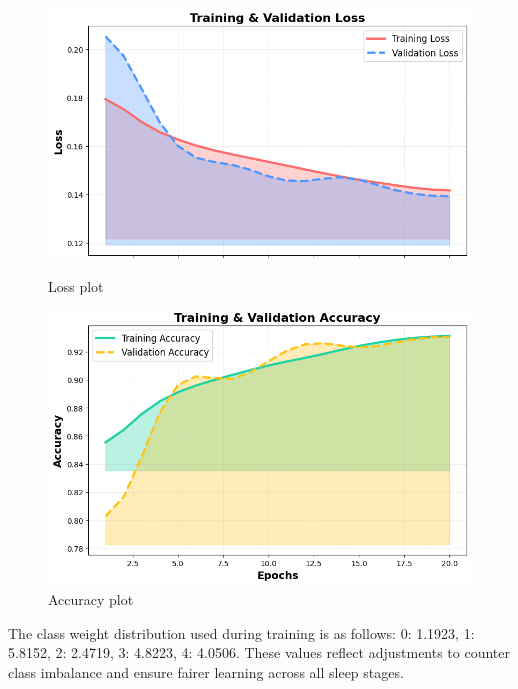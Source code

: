 \begin{figure}[htbp]
	\centering
	\begin{minipage}[b]{0.45\linewidth}
		\includegraphics[width=\linewidth]{img/paper_3/loss plot}
		\caption{Loss plot}
		\label{fig:loss-plot}
	\end{minipage}
	\hfill
	\begin{minipage}[b]{0.45\linewidth}
		\includegraphics[width=\linewidth]{img/paper_3/accuracy plot}
		\caption{Accuracy plot}
		\label{fig:accuracy-plot}
	\end{minipage}
\end{figure}

The class weight distribution used during training is as follows: 0: 1.1923, 1: 5.8152, 2: 2.4719, 3: 4.8223, 4: 4.0506. These values reflect adjustments to counter class imbalance and ensure fairer learning across all sleep stages.

